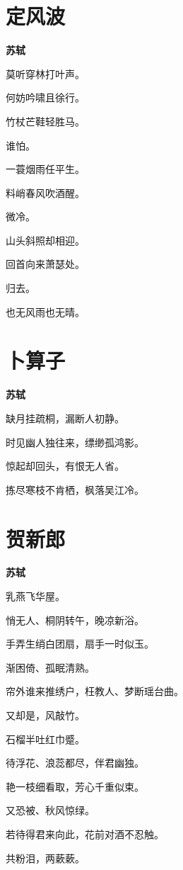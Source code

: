 \documentclass[12pt,a4paper]{ctexbook}
\begin{document}
\section{定风波}
\textbf{苏轼}\par\vspace{0.5em}
莫听穿林打叶声。\par
何妨吟啸且徐行。\par
竹杖芒鞋轻胜马。\par
谁怕。\par
一蓑烟雨任平生。\par
料峭春风吹酒醒。\par
微冷。\par
山头斜照却相迎。\par
回首向来萧瑟处。\par
归去。\par
也无风雨也无晴。\par

\section{卜算子}
\textbf{苏轼}\par\vspace{0.5em}
缺月挂疏桐，漏断人初静。\par
时见幽人独往来，缥缈孤鸿影。\par
惊起却回头，有恨无人省。\par
拣尽寒枝不肯栖，枫落吴江冷。\par

\section{贺新郎}
\textbf{苏轼}\par\vspace{0.5em}
乳燕飞华屋。\par
悄无人、桐阴转午，晚凉新浴。\par
手弄生绡白团扇，扇手一时似玉。\par
渐困倚、孤眠清熟。\par
帘外谁来推绣户，枉教人、梦断瑶台曲。\par
又却是，风敲竹。\par
石榴半吐红巾蹙。\par
待浮花、浪蕊都尽，伴君幽独。\par
艳一枝细看取，芳心千重似束。\par
又恐被、秋风惊绿。\par
若待得君来向此，花前对酒不忍触。\par
共粉泪，两蔌蔌。\par
\end{document}
